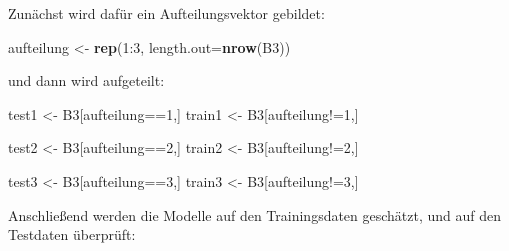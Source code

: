 \documentclass[12pt,]{book}
\makeatletter
\newenvironment{Shaded}{\begin{snugshade}}{\end{snugshade}}
\newcommand{\KeywordTok}[1]{\textcolor[rgb]{0.13,0.29,0.53}{\textbf{{#1}}}}
\newcommand{\DataTypeTok}[1]{\textcolor[rgb]{0.13,0.29,0.53}{{#1}}}
\newcommand{\DecValTok}[1]{\textcolor[rgb]{0.00,0.00,0.81}{{#1}}}
\newcommand{\StringTok}[1]{\textcolor[rgb]{0.31,0.60,0.02}{{#1}}}
\newcommand{\NormalTok}[1]{{#1}}
\newenvironment{kframe}{%
\medskip{}
\setlength{\fboxsep}{.8em}
 \def\at@end@of@kframe{}%
 \ifinner\ifhmode%
  \def\at@end@of@kframe{\end{minipage}}%
  \begin{minipage}{\columnwidth}%
 \fi\fi%
 \def\FrameCommand##1{\hskip\@totalleftmargin \hskip-\fboxsep
 \colorbox{shadecolor}{##1}\hskip-\fboxsep
     \hskip-\linewidth \hskip-\@totalleftmargin \hskip\columnwidth}%
 \MakeFramed {\advance\hsize-\width
   \@totalleftmargin\z@ \linewidth\hsize
   \@setminipage}}%
 {\par\unskip\endMakeFramed%
 \at@end@of@kframe}
\renewenvironment{Shaded}{\begin{kframe}}{\end{kframe}}
\makeatother
\begin{document}
Zunächst wird dafür ein Aufteilungsvektor gebildet:

\begin{Shaded}
\begin{Highlighting}[]
\NormalTok{aufteilung <-}\StringTok{ }\KeywordTok{rep}\NormalTok{(}\DecValTok{1}\NormalTok{:}\DecValTok{3}\NormalTok{, }\DataTypeTok{length.out=}\KeywordTok{nrow}\NormalTok{(B3))}
\end{Highlighting}
\end{Shaded}

und dann wird aufgeteilt:

\begin{Shaded}
\begin{Highlighting}[]
\NormalTok{test1 <-}\StringTok{ }\NormalTok{B3[aufteilung==}\DecValTok{1}\NormalTok{,]}
\NormalTok{train1 <-}\StringTok{ }\NormalTok{B3[aufteilung!=}\DecValTok{1}\NormalTok{,]}

\NormalTok{test2 <-}\StringTok{ }\NormalTok{B3[aufteilung==}\DecValTok{2}\NormalTok{,]}
\NormalTok{train2 <-}\StringTok{ }\NormalTok{B3[aufteilung!=}\DecValTok{2}\NormalTok{,]}

\NormalTok{test3 <-}\StringTok{ }\NormalTok{B3[aufteilung==}\DecValTok{3}\NormalTok{,]}
\NormalTok{train3 <-}\StringTok{ }\NormalTok{B3[aufteilung!=}\DecValTok{3}\NormalTok{,]}
\end{Highlighting}
\end{Shaded}

Anschließend werden die Modelle auf den Trainingsdaten geschätzt, und
auf den Testdaten überprüft:
\end{document}
